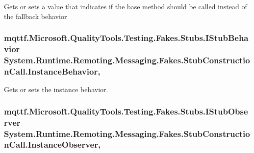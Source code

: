 Gets or sets a value that indicates if the base method should be called instead of the fallback behavior

\hypertarget{class_system_1_1_runtime_1_1_remoting_1_1_messaging_1_1_fakes_1_1_stub_construction_call_a3d7828a4dcce3a77932effbbd1f982cf}{
\subsubsection[{Instance\-Behavior}]{\setlength{\rightskip}{0pt plus 5cm}mqttf.\-Microsoft.\-Quality\-Tools.\-Testing.\-Fakes.\-Stubs.\-I\-Stub\-Behavior System.\-Runtime.\-Remoting.\-Messaging.\-Fakes.\-Stub\-Construction\-Call.\-Instance\-Behavior\hspace{0.3cm}{\ttfamily [get]}, {\ttfamily [set]}}}\label{class_system_1_1_runtime_1_1_remoting_1_1_messaging_1_1_fakes_1_1_stub_construction_call_a3d7828a4dcce3a77932effbbd1f982cf}


Gets or sets the instance behavior.

\hypertarget{class_system_1_1_runtime_1_1_remoting_1_1_messaging_1_1_fakes_1_1_stub_construction_call_ae891eb3a30b914c33e8d2abc0ea06213}{
\subsubsection[{Instance\-Observer}]{\setlength{\rightskip}{0pt plus 5cm}mqttf.\-Microsoft.\-Quality\-Tools.\-Testing.\-Fakes.\-Stubs.\-I\-Stub\-Observer System.\-Runtime.\-Remoting.\-Messaging.\-Fakes.\-Stub\-Construction\-Call.\-Instance\-Observer\hspace{0.3cm}{\ttfamily [get]}, {\ttfamily [set]}}}\label{class_system_1_1_runtime_1_1_remoting_1_1_messaging_1_1_fakes_1_1_stub_construction_call_ae891eb3a30b914c33e8d2abc0ea06213}


